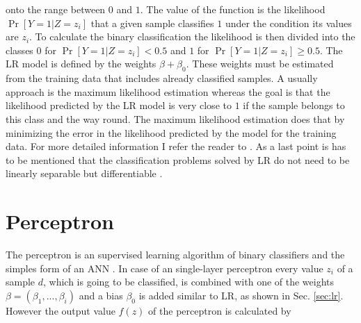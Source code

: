 onto the range between $0$ and $1$.
The value of the function is the likelihood $\Pr[Y = 1 | Z = z_i]$ that a given sample classifies $1$ under the condition its values are $z_i$.
To calculate the binary classification the likelihood is then divided into the classes $0$ for $\Pr[Y = 1 | Z = z_i] < 0.5$ and $1$ for $\Pr[Y = 1 | Z = z_i] \ge 0.5$.
The \ac{LR} model is defined by the weights $\beta + \beta_0$. %
These weights must be estimated from the training data that includes already classified samples.
A usually approach is the maximum likelihood estimation whereas the goal is that the likelihood predicted by the \ac{LR} model is very close to $1$ if the sample belongs to this class and the way round.
The maximum likelihood estimation does that by minimizing the error in the likelihood predicted by the model for the training data. %
For more detailed information I refer the reader to \cite{2017MaximumEstimation}.
As a last point is has to be mentioned that the classification problems solved by \ac{LR} do not need to be linearly separable but differentiable \cite{Ruhrmair2010ModelingFunctions}.


\section{Perceptron}
\label{sec:perceptron}

The perceptron is an supervised learning algorithm of binary classifiers and the simples form of an \ac{ANN} \cite{Rosenblatt1957TheAutomaton}. 
In case of an single-layer perceptron every value $z_i$ of a sample $d$, which is going to be classified, is combined with one of the weights $\beta =(\beta_1, ..., \beta_i)$ and a bias $\beta_0$ is added similar to \ac{LR}, as shown in Sec. \ref{sec:lr}.
However the output value $f(z)$ of the perceptron is calculated by

